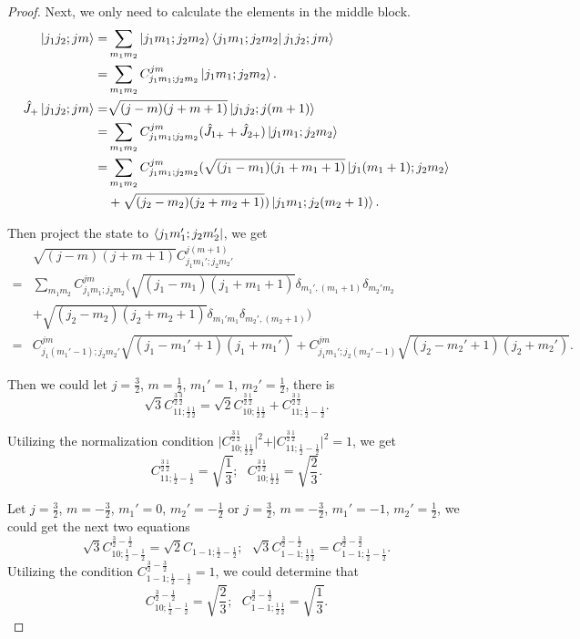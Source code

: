 \documentclass[reqno,a4paper,12pt]{amsart}
\begin{document}
\begin{enumerate}[1.]
\begin{proof}
	Next, we only need to calculate the elements in the middle block.
	\begin{align*}
		\ket{j_1j_2; j m} =& \sum_{m_1 m_2} \ket{j_1 m_1; j_2 m_2} \bra{j_1 m_1; j_2 m_2} j_1j_2; j m \rangle \\
		=& \sum_{m_1 m_2} C_{j_1m_1;j_2m_2}^{jm} \ket{j_1m_1; j_2m_2}. \\
		\hat{J}_+ \ket{j_1j_2; j m} =& \sqrt{(j-m)(j+m+1)} \ket{j_1j_2; j (m+1)} \\
		=& \sum_{m_1m_2} C_{j_1m_1; j_2m_2}^{jm} (\hat{J}_{1+} + \hat{J}_{2+}) \ket{j_1m_1; j_2m_2} \\
		=& \sum_{m_1m_2} C_{j_1m_1; j_2m_2}^{jm} (\sqrt{(j_1-m_1)(j_1+m_1+1)} \ket{j_1(m_1+1); j_2m_2} \\
		&+ \sqrt{(j_2-m_2)(j_2+m_2+1)}) \ket{j_1m_1; j_2(m_2+1)}.
	\end{align*}
	
	Then project the state to $\bra{j_1m_1'; j_2m_2'}$, we get
	\begin{align*}
		&\sqrt{(j-m)(j+m+1)} C_{j_1m_1'; j_2m_2'}^{j(m+1)} \\
		=& \sum_{m_1m_2} C_{j_1m_1; j_2m_2}^{jm} (\sqrt{(j_1-m_1)(j_1+m_1+1)} \delta_{m_1', (m_1+1)}\delta_{m_2'm_2} \\
		&+ \sqrt{(j_2-m_2)(j_2+m_2+1)} \delta_{m_1'm_1} \delta_{m_2',(m_2+1)}) \\
		=& C_{j_1(m_1'-1); j_2m_2'}^{jm} \sqrt{(j_1-m_1'+1)(j_1+m_1')} + C_{j_1m_1';j_2(m_2'-1)}^{jm} \sqrt{(j_2-m_2'+1)(j_2+m_2')}.
	\end{align*}
	
	Then we could let $j = \frac{3}{2}$, $m=\frac{1}{2}$, $m_1' = 1$, $m_2' = \frac{1}{2}$, there is 
	\[
		\sqrt{3}C_{11;\frac{1}{2}\frac{1}{2}}^{\frac{3}{2}\frac{3}{2}} = \sqrt{2}C_{10;\frac{1}{2}\frac{1}{2}}^{\frac{3}{2}\frac{1}{2}} + C_{11;\frac{1}{2}-\frac{1}{2}}^{\frac{3}{2}\frac{1}{2}}.
	\]
	
	Utilizing the normalization condition $\vert C_{10;\frac{1}{2}\frac{1}{2}}^{\frac{3}{2}\frac{1}{2}} \vert^2 + \vert C_{11;\frac{1}{2}-\frac{1}{2}}^{\frac{3}{2}\frac{1}{2}} \vert^2 = 1$, we get 
	\[
		C_{11;\frac{1}{2}-\frac{1}{2}}^{\frac{3}{2}\frac{1}{2}} = \sqrt{\frac{1}{3}}; \ \ \ C_{10;\frac{1}{2}\frac{1}{2}}^{\frac{3}{2}\frac{1}{2}} = \sqrt{\frac{2}{3}}.
	\]
	
	Let $j = \frac{3}{2}$, $m = -\frac{3}{2}$, $m_1' = 0$, $m_2' = -\frac{1}{2}$ or $j = \frac{3}{2}$, $m = -\frac{3}{2}$, $m_1' = -1$, $m_2' = \frac{1}{2}$, we could get the next two equations
	\[
		\sqrt{3}C_{10;\frac{1}{2}-\frac{1}{2}}^{\frac{3}{2}-\frac{1}{2}} = \sqrt{2}C_{1-1; \frac{1}{2}-\frac{1}{2}}; \ \ \ \sqrt{3}C_{1-1;\frac{1}{2}\frac{1}{2}}^{\frac{3}{2}-\frac{1}{2}} = C_{1-1;\frac{1}{2}-\frac{1}{2}}^{\frac{3}{2}-\frac{3}{2}}.
	\]
	Utilizing the condition $C_{1-1;\frac{1}{2}-\frac{1}{2}}^{\frac{3}{2}-\frac{3}{2}} = 1$, we could determine that 
	\[
		C_{10;\frac{1}{2}-\frac{1}{2}}^{\frac{3}{2}-\frac{1}{2}} = \sqrt{\frac{2}{3}}; \ \ \ C_{1-1;\frac{1}{2}\frac{1}{2}}^{\frac{3}{2}-\frac{1}{2}} = \sqrt{\frac{1}{3}}.
	\]
	

\end{proof}
\end{enumerate}
\end{document}
